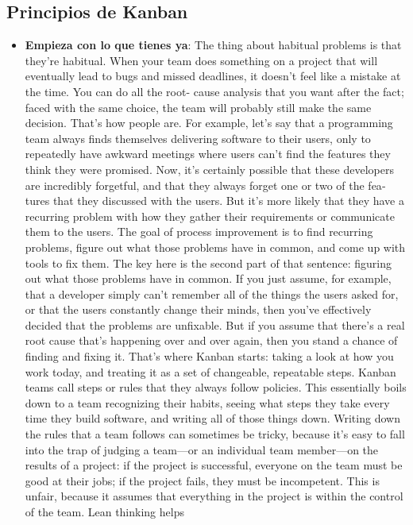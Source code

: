\subsection{Principios de Kanban}
\begin{itemize}
    \item \textbf{Empieza con lo que tienes ya}: %
    The thing about habitual problems is that they're habitual.
When your team does something on a project that will eventually lead to bugs and
missed deadlines, it doesn't feel like a mistake at the time. You can do all the root-
cause analysis that you want after the fact; faced with the same choice, the team will
probably still make the same decision. That's how people are.
For example, let's say that a programming team always finds themselves delivering
software to their users, only to repeatedly have awkward meetings where users can't
find the features they think they were promised. Now, it's certainly possible that these
developers are incredibly forgetful, and that they always forget one or two of the fea‐
tures that they discussed with the users. But it's more likely that they have a recurring
problem with how they gather their requirements or communicate them to the users.
The goal of process improvement is to find recurring problems, figure out what those
problems have in common, and come up with tools to fix them.
The key here is the second part of that sentence: figuring out what those problems
have in common. If you just assume, for example, that a developer simply can't
remember all of the things the users asked for, or that the users constantly change
their minds, then you've effectively decided that the problems are unfixable. But if
you assume that there's a real root cause that's happening over and over again, then
you stand a chance of finding and fixing it.
That's where Kanban starts: taking a look at how you work today, and treating it as a
set of changeable, repeatable steps. Kanban teams call steps or rules that they always
follow policies. This essentially boils down to a team recognizing their habits, seeing
what steps they take every time they build software, and writing all of those things
down.
Writing down the rules that a team follows can sometimes be tricky, because it's easy
to fall into the trap of judging a team—or an individual team member—on the results
of a project: if the project is successful, everyone on the team must be good at their
jobs; if the project fails, they must be incompetent. This is unfair, because it assumes
that everything in the project is within the control of the team. Lean thinking helps

\end{itemize}
